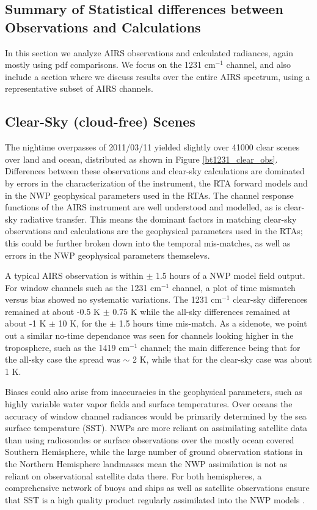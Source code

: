 \documentclass[agupp]{aguplus}              %
\newcommand{\wn}{cm$^{-1}$\xspace}
\begin{document}
\begin{article}
\section{Summary of Statistical differences between Observations and Calculations} 

In this section we analyze AIRS observations and calculated radiances,
again mostly using pdf comparisons. We focus on the 1231 \wn channel,
and also include a section where we discuss results over the entire
AIRS spectrum, using a representative subset of AIRS channels.

\subsection{Clear-Sky (cloud-free) Scenes} 
\label{Clear-Sky}

The nightime overpasses of 2011/03/11 yielded slightly over 41000
clear scenes over land and ocean, distributed as shown in Figure
\ref{bt1231_clear_obs}. Differences between these observations and
clear-sky calculations are dominated by errors in the
characterization of the instrument, the RTA forward models and in the
NWP geophysical parameters used in the RTAs. The channel response
functions of the AIRS instrument are well understood and modelled, as
is clear-sky radiative transfer. This means the dominant factors in
matching clear-sky observations and calculations are the geophysical
parameters used in the RTAs; this could be further broken down into the
temporal mis-matches, as well as errors in the NWP geophysical
parameters themselevs.

A typical AIRS observation is within $\pm$ 1.5 hours of a NWP model
field output. For window channels such as the 1231 \wn channel, a plot
of time mismatch versus bias showed no systematic variations. The 1231
\wn clear-sky differences remained at about -0.5 K $\pm$ 0.75 K while the
all-sky differences remained at about -1 K $\pm$ 10 K, for the $\pm$ 1.5 hours
time mis-match. As a sidenote, we point out a similar no-time
dependance was seen for channels looking higher in the troposphere,
such as the 1419 \wn channel; the main difference being that for the
all-sky case the spread was $\sim$ 2 K, while that for the clear-sky
case was about 1 K.

Biases could also arise from inaccuracies in the geophysical parameters, such
as highly variable water vapor fields and surface temperatures. Over
oceans the accuracy of window channel radiances would be primarily
determined by the sea surface temperature (SST). NWPs are more reliant
on assimilating satellite data than using radiosondes or surface
observations over the mostly ocean covered Southern Hemisphere, while
the large number of ground observation stations in the Northern
Hemisphere landmasses mean the NWP assimilation is not as reliant on
observational satellite data there. For both hemispheres, a
comprehensive network of buoys and ships as well as satellite
observations ensure that SST is a high quality product regularly
assimilated into the NWP models \citep{rey:02}.


\end{article}
\end{document}
